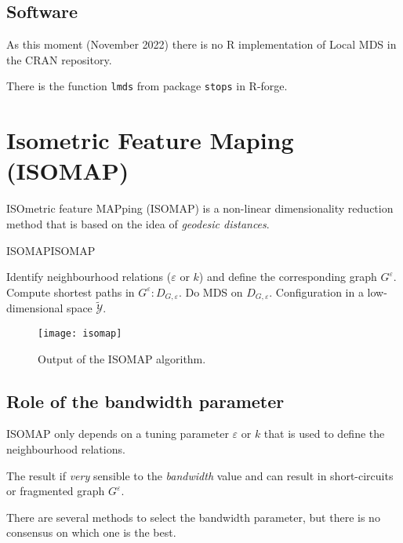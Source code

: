 \subsection{Software}

As this moment (November 2022) there is no R implementation of Local MDS
in the CRAN repository.

There is the function \texttt{lmds} from package \texttt{stops} in R-forge.


\clearpage
\section{Isometric Feature Maping (ISOMAP)}

ISOmetric feature MAPping (ISOMAP) is a non-linear dimensionality reduction
method that is based on the idea of \emph{geodesic distances}.

\begin{algorithm}{ISOMAP}{ISOMAP}
	\begin{algorithmic}[1]
		 
		\State Identify neighbourhood relations ($\varepsilon$ or $k$) and define the
		corresponding graph $G^\varepsilon$.
		\State Compute shortest paths in $G^\varepsilon: D_{G,\varepsilon}$.
		\State Do MDS on $D_{G,\varepsilon}$.
		\State \Return Configuration in a low-dimensional space $\mathcal{\tilde{Y}}$.
		\EndProcedure
	\end{algorithmic}
\end{algorithm}

\begin{figure}[H]
	\texttt{[image: isomap]}
	\caption{Output of the ISOMAP algorithm.}
\end{figure}

\subsection{Role of the bandwidth parameter}
ISOMAP only depends on a tuning parameter $\varepsilon$ or $k$ that is used to
define the neighbourhood relations.

\begin{marker}
    The result if \emph{very} sensible to the \emph{bandwidth} value and can result
	in short-circuits or fragmented graph $G^\varepsilon$.
\end{marker}

There are several methods to select the bandwidth parameter, but there
is no consensus on which one is the best.

